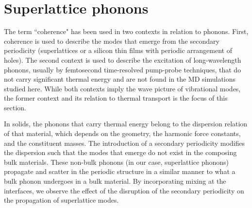 \documentclass[aps,prb,preprint,preprintnumbers,amsmath,amssymb,floatfix,superscriptaddress]{revtex4}
\begin{document}
\begin{comment}
The noise in the contribution distribution at longer MFPs is consequence of the limited resolution of the Brouillin zone enforced by the MD domain. This has been observed in other mode by mode analysis techniques, such as the real space force constant extraction from DFT method used by Esfarjani, where the limited resolution manifested in a stepwise behavior of thermal conductivity accumulation function of bulk silicon. \cite{PhysRevB.84.085204} The linear behavior of the dispersion near the gamma point of the Brouillin zone and the $\omega^{-2}$ scaling of the lifetimes allowed for the contribution of these unresolved long-wavelength modes to be estimated. The linear extrapolation procedure used to predict bulk thermal conductivities \cite{PhysRevB.81.214305} was not used in previous superlattice studies \cite{doi:10.1021/nl202186y,Luckyanova16112012} and is not used here. The complicated dispersion [Fig.~\ref{fig:dispersion}(a-c)] does not guarantee that such an approach is viable, as such, understanding size effects in superlattices warrants further work.
\end{comment}

\section{Superlattice phonons}\label{SEC:sl_phon}

The term ``coherence" has been used in two contexts in relation to phonons. First, coherence is used to describe the modes that emerge from the secondary periodicity (superlattices or a silicon thin films with periodic arrangement of holes\cite{doi:10.1021/nl102918q,PhysRevB.87.195301}). The second context is used to describe the excitation of long-wavelength phonons, usually by femtosecond time-resolved pump-probe techniques,\cite{PhysRevLett.73.740,PhysRevB.75.195309} that do not carry significant thermal energy and are not found in the MD simulations studied here. While both contexts imply the wave picture of vibrational modes, the former context and its relation to thermal transport is the focus of this section.

In solids, the phonons that carry thermal energy belong to the dispersion relation of that material, which depends on the geometry, the harmonic force constants, and the constituent masses. The introduction of a secondary periodicity modifies the dispersion such that the modes that emerge do not exist in the composing bulk materials. These non-bulk phonons (in our case, superlattice phonons) propagate and scatter in the periodic structure in a similar manner to what a bulk phonon undergoes in a bulk material. By incorporating mixing at the interfaces, we observe the effect of the disruption of the secondary periodicity on the propagation of superlattice modes. %
\end{document}
